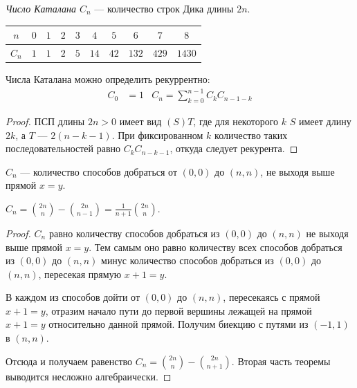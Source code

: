 \documentclass[12pt,a4paper]{article}
\begin{document}
    \begin{definition}
        \emph{Число Каталана $C_n$} --- количество строк Дика длины $2n$.

        \begin{table}[h]
            \centering
            \begin{tabular}{c|ccccccccc}
                $n$& $0$& $1$& $2$& $3$& $4$& $5$& $6$& $7$& $8$\\
                \hline
                $C_n$& $1$& $1$& $2$& $5$& $14$& $42$& $132$& $429$& $1430$
            \end{tabular}
        \end{table}
    \end{definition}

    \begin{statement}
        Числа Каталана можно определить рекуррентно:
        \begin{align*}
            C_0 &= 1&
            C_n = \sum_{k=0}^{n-1}C_k C_{n-1-k}
        \end{align*}
    \end{statement}

    \begin{proof}
        ПСП длины $2n > 0$ имеет вид $(S)T$, где для некоторого $k$ $S$ имеет длину $2k$, а $T$ --- $2(n-k-1)$. При фиксированном $k$ количество таких последовательностей равно $C_k C_{n-k-1}$, откуда следует рекурента.
    \end{proof}

    \begin{remark}
        $C_n$ --- количество способов добраться от $(0, 0)$ до $(n, n)$, не выходя выше прямой $x=y$.
    \end{remark}

    \begin{theorem}
        $C_n = \binom{2n}{n} - \binom{2n}{n-1} = \frac{1}{n+1}\binom{2n}{n}$.
    \end{theorem}

    \begin{proof}
        $C_n$ равно количеству способов добраться из $(0, 0)$ до $(n, n)$ не выходя выше прямой $x=y$. Тем самым оно равно количеству всех способов добраться из $(0, 0)$ до $(n, n)$ минус количество способов добраться из $(0, 0)$ до $(n, n)$, пересекая прямую $x+1=y$.

        В каждом из способов дойти от $(0, 0)$ до $(n, n)$, пересекаясь с прямой $x+1=y$, отразим начало пути до первой вершины лежащей на прямой $x+1=y$ относительно данной прямой. Получим биекцию с путями из $(-1, 1)$ в $(n, n)$.

        Отсюда и получаем равенство $C_n = \binom{2n}{n} - \binom{2n}{n+1}$. Вторая часть теоремы выводится несложно алгебраически.
    \end{proof}
\end{document}
